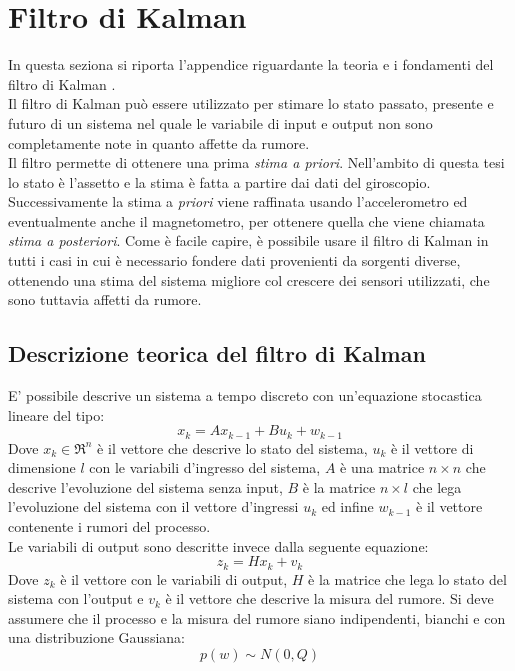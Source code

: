 \chapter{Filtro di Kalman}
\label{appendixKalman}
In questa seziona si riporta l'appendice riguardante la teoria e i fondamenti del filtro di Kalman \cite{trackingThesis}.\\
Il filtro di Kalman può essere utilizzato per stimare lo stato passato, presente e futuro di un sistema nel quale le variabile di input e output non sono completamente note in quanto affette da rumore.\\
Il filtro permette di ottenere una prima \textit{stima a priori}. Nell'ambito di questa tesi lo stato è l'assetto e la stima è fatta a partire dai dati del giroscopio. Successivamente la stima a \textit{priori} viene raffinata usando l'accelerometro ed eventualmente anche il magnetometro, per ottenere quella che viene chiamata \textit{stima a posteriori}.
Come è facile capire, è possibile usare il filtro di Kalman in tutti i casi in cui è necessario fondere dati provenienti da sorgenti diverse, ottenendo una stima del sistema migliore col crescere dei sensori utilizzati, che sono tuttavia affetti da rumore.

\section{Descrizione teorica del filtro di Kalman}
\label{filtroKalmanLineare}
E' possibile descrive un sistema a tempo discreto con un'equazione stocastica lineare del tipo:
\begin{equation}
x_k = Ax_{k-1} + B u_k + w_{k-1}
\end{equation}
Dove $x_k \in \Re^n$ è il vettore che descrive lo stato del sistema, $u_k$ è il vettore di dimensione $l$ con le variabili d'ingresso del sistema, $A$ è una matrice $n \times n$ che descrive l'evoluzione del sistema senza input, $B$ è la matrice $n \times l$ che lega l'evoluzione del sistema con il vettore d'ingressi $u_k$ ed infine $w_{k-1}$ è il vettore contenente i rumori del processo.\\
Le variabili di output sono descritte invece dalla seguente equazione:
\begin{equation}
z_k = Hx_k + v_k
\end{equation}
Dove $z_k$ è il vettore con le variabili di output, $H$ è la matrice che lega lo stato del sistema con l'output e $v_k$ è il vettore che descrive la misura del rumore.
Si deve assumere che il processo e la misura del rumore siano indipendenti, bianchi e con una distribuzione Gaussiana:
\begin{equation}
p(w) \sim N(0,Q)
\end{equation}

